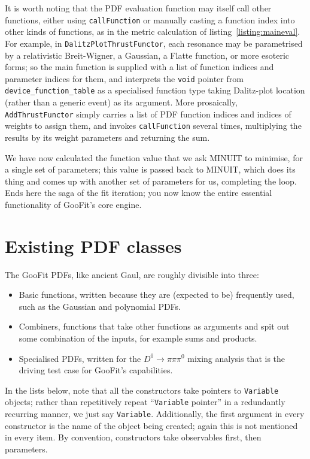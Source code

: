 \documentclass[12pt,pdflatex]{article}
\begin{document}
It is worth noting that the PDF evaluation function may itself call other functions,
either using \verb|callFunction| or manually casting a function index into other
kinds of functions, as in the metric calculation of listing~\ref{listing:maineval}.
For example, in \verb|DalitzPlotThrustFunctor|, each resonance may be parametrised
by a relativistic Breit-Wigner, a Gaussian, a Flatte function, or more esoteric forms;
so the main function is supplied with a list of function indices and parameter indices
for them, and interprets the \verb|void| pointer from \verb|device_function_table| as a specialised
function type taking Dalitz-plot location (rather than a generic event) as its argument. 
More prosaically, \verb|AddThrustFunctor| simply carries a list of PDF function indices
and indices of weights to assign them, and invokes \verb|callFunction| several times,
multiplying the results by its weight parameters and returning the sum. 

We have now calculated the function value that we ask MINUIT to minimise, for 
a single set of parameters; this value is passed back to MINUIT, which does its
thing and comes up with another set of parameters for us, completing the loop. 
Ends here the saga of the fit iteration; you now know the entire essential
functionality of GooFit's core engine. 

\section{Existing PDF classes}

The GooFit PDFs, like ancient Gaul, are roughly divisible into three:
\begin{itemize}
\item Basic functions, written because they are (expected to be) frequently used,
such as the Gaussian and polynomial PDFs.
\item Combiners, functions that take other functions as arguments and
spit out some combination of the inputs, for example sums and products.
\item Specialised PDFs, written for the $D^0\to\pi\pi\pi^0$ mixing analysis
that is the driving test case for GooFit's capabilities. 
\end{itemize}

In the lists below, note that all the constructors
take pointers to \texttt{Variable} objects; rather than 
repetitively repeat ``\texttt{Variable} pointer''
in a redundantly recurring manner, we just say \texttt{Variable}. 
Additionally, the first argument in every constructor is the name
of the object being created; again this is not mentioned in every
item. By convention, constructors take observables first, then parameters. 
\end{document}
